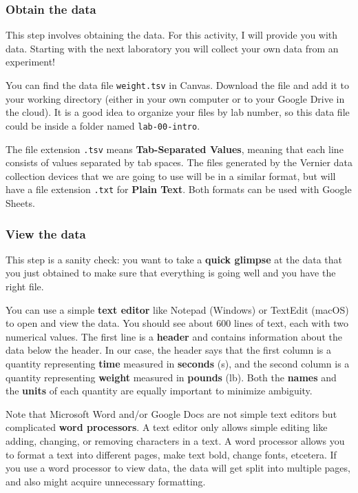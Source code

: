 \subsubsection{Obtain the data}
%
This step involves obtaining the data. For this activity, I will provide you with data. Starting with the next laboratory you will collect your own data from an experiment!

You can find the data file \texttt{weight.tsv} in Canvas. Download the file and add it to your working directory (either in your own computer or to your Google Drive in the cloud). It is a good idea to organize your files by lab number, so this data file could be inside a folder named \texttt{lab-00-intro}.

The file extension \texttt{.tsv} means \textbf{Tab-Separated Values}, meaning that each line consists of values separated by tab spaces. The files generated by the Vernier data collection devices that we are going to use will be in a similar format, but will have a file extension \texttt{.txt} for \textbf{Plain Text}. Both formats can be used with Google Sheets.
%
\subsubsection{View the data}
%
This step is a sanity check: you want to take a \textbf{quick glimpse} at the data that you just obtained to make sure that everything is going well and you have the right file.

You can use a simple \textbf{text editor} like Notepad (Windows) or TextEdit (macOS) to open and view the data. You should see about 600 lines of text, each with two numerical values. The first line is a \textbf{header} and contains information about the data below the header. In our case, the header says that the first column is a quantity representing \textbf{time} measured in \textbf{seconds} (s), and the second column is a quantity representing \textbf{weight} measured in \textbf{pounds} (lb). Both the \textbf{names} and the \textbf{units} of each quantity are equally important to minimize ambiguity.

Note that Microsoft Word and/or Google Docs are not simple text editors but complicated \textbf{word processors}. A text editor only allows simple editing like adding, changing, or removing characters in a text. A word processor allows you to format a text into different pages, make text bold, change fonts, etcetera. If you use a word processor to view data, the data will get split into multiple pages, and also might acquire unnecessary formatting.

